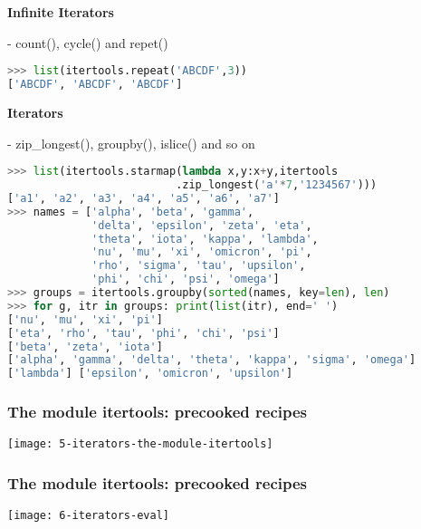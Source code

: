 \textbf{Infinite Iterators}

- count(), cycle() and repet()

\begin{lstlisting}[language=Python]
>>> list(itertools.repeat('ABCDF',3))
['ABCDF', 'ABCDF', 'ABCDF']
\end{lstlisting}

\textbf{Iterators}

- zip\_longest(), groupby(), islice() and so on

\begin{lstlisting}[language=Python]
>>> list(itertools.starmap(lambda x,y:x+y,itertools
                          .zip_longest('a'*7,'1234567')))
['a1', 'a2', 'a3', 'a4', 'a5', 'a6', 'a7']
>>> names = ['alpha', 'beta', 'gamma', 
             'delta', 'epsilon', 'zeta', 'eta',
	         'theta', 'iota', 'kappa', 'lambda', 
	         'nu', 'mu', 'xi', 'omicron', 'pi',
	         'rho', 'sigma', 'tau', 'upsilon', 
	         'phi', 'chi', 'psi', 'omega']
>>> groups = itertools.groupby(sorted(names, key=len), len)
>>> for g, itr in groups: print(list(itr), end=' ')
['nu', 'mu', 'xi', 'pi'] 
['eta', 'rho', 'tau', 'phi', 'chi', 'psi']
['beta', 'zeta', 'iota'] 
['alpha', 'gamma', 'delta', 'theta', 'kappa', 'sigma', 'omega'] 
['lambda'] ['epsilon', 'omicron', 'upsilon']
\end{lstlisting}

\subsubsection{The module itertools: precooked recipes}

\begin{center}
\texttt{[image: 5-iterators-the-module-itertools]}
\end{center}

\subsubsection{The module itertools: precooked recipes}

\begin{center}
\texttt{[image: 6-iterators-eval]}
\end{center}


